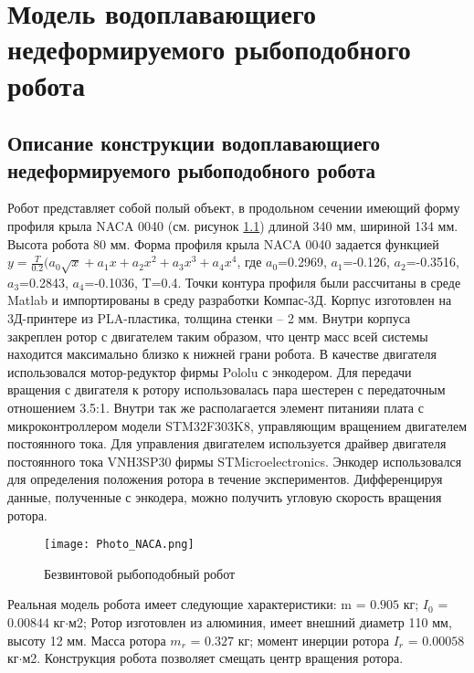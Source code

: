 \chapter{Модель водоплавающиего недеформируемого рыбоподобного робота}\label{ch:ch6}

\section{Описание конструкции водоплавающиего недеформируемого рыбоподобного робота}

Робот представляет собой полый объект, в продольном сечении имеющий форму профиля крыла NACA 0040 (см. рисунок \ref{Photo_NACA}) длиной 340 мм, шириной 134 мм. Высота робота 80 мм. Форма профиля крыла NACA 0040 задается функцией 
$ y = \frac{T}{0.2}(a_0\sqrt{x} + a_1x + a_2x^2 + a_3x^3 + a_4x^4 $, где $a_0$=0.2969, $a_1$=-0.126, $a_2$=-0.3516, $a_3$=0.2843, $a_4$=-0.1036, T=0.4. Точки контура профиля были рассчитаны в среде Matlab и импортированы в среду разработки Компас-3Д.	
Корпус изготовлен на 3Д-принтере из PLA-пластика, толщина стенки -- 2 мм. Внутри корпуса закреплен ротор с двигателем таким образом, что центр масс всей системы находится максимально близко к нижней грани робота. В качестве двигателя использовался мотор-редуктор фирмы Pololu с энкодером. Для передачи вращения с двигателя к ротору использовалась пара шестерен с передаточным отношением 3.5:1. Внутри так же располагается элемент питанияи плата с микроконтроллером модели STM32F303K8, управляющим вращением двигателем постоянного тока. Для управления двигателем используется драйвер двигателя постоянного тока VNH3SP30 фирмы STMicroelectronics. Энкодер использовался для определения положения ротора в течение экспериментов. Дифференцируя данные, полученные с энкодера, можно получить угловую скорость вращения ротора.


\begin{figure}[h]
	\centering
	\texttt{[image: Photo\_NACA.png]}%
	\caption{Безвинтовой рыбоподобный робот}
	\label{Photo_NACA}
\end{figure}

Реальная модель робота имеет следующие характеристики: m = $0.905$ кг; $I_0$ = $0.00844$ кг$\cdot$м2; Ротор изготовлен из алюминия, имеет внешний диаметр 110 мм, высоту 12 мм. Масса ротора $m_r$ = $0.327$ кг; момент инерции ротора $I_r$ = $0.00058$ кг$\cdot$м2. Конструкция робота позволяет смещать центр вращения ротора.

